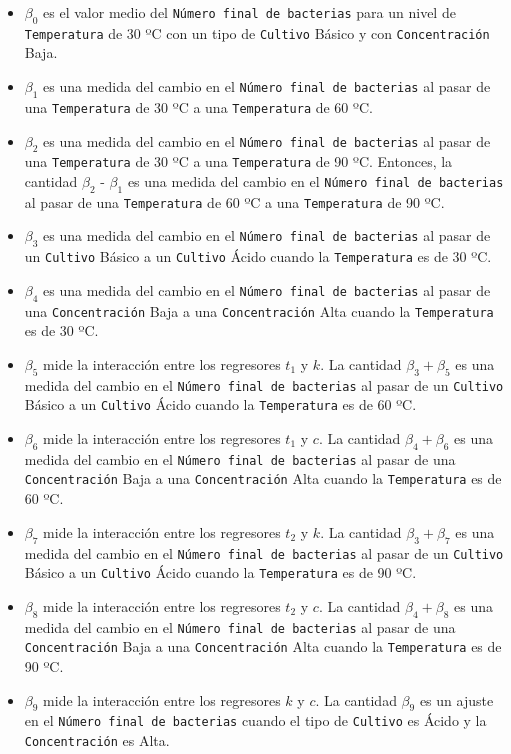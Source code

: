 \documentclass[10pt, spanish]{article}
\begin{document}
\begin{itemize}
\item
  \(\beta_0\) es el valor medio del
  \texttt{Número\ final\ de\ bacterias} para un nivel de
  \texttt{Temperatura} de 30 ºC con un tipo de \texttt{Cultivo} Básico y
  con \texttt{Concentración} Baja.
\item
  \(\beta_1\) es una medida del cambio en el
  \texttt{Número\ final\ de\ bacterias} al pasar de una
  \texttt{Temperatura} de 30 ºC a una \texttt{Temperatura} de 60 ºC.
\item
  \(\beta_2\) es una medida del cambio en el
  \texttt{Número\ final\ de\ bacterias} al pasar de una
  \texttt{Temperatura} de 30 ºC a una \texttt{Temperatura} de 90 ºC.
  Entonces, la cantidad \(\beta_2\) - \(\beta_1\) es una medida del
  cambio en el \texttt{Número\ final\ de\ bacterias} al pasar de una
  \texttt{Temperatura} de 60 ºC a una \texttt{Temperatura} de 90 ºC.
\item
  \(\beta_3\) es una medida del cambio en el
  \texttt{Número\ final\ de\ bacterias} al pasar de un \texttt{Cultivo}
  Básico a un \texttt{Cultivo} Ácido cuando la \texttt{Temperatura} es
  de 30 ºC.
\item
  \(\beta_4\) es una medida del cambio en el
  \texttt{Número\ final\ de\ bacterias} al pasar de una
  \texttt{Concentración} Baja a una \texttt{Concentración} Alta cuando
  la \texttt{Temperatura} es de 30 ºC.
\item
  \(\beta_5\) mide la interacción entre los regresores \(t_1\) y \(k\).
  La cantidad \(\beta_3 + \beta_5\) es una medida del cambio en el
  \texttt{Número\ final\ de\ bacterias} al pasar de un \texttt{Cultivo}
  Básico a un \texttt{Cultivo} Ácido cuando la \texttt{Temperatura} es
  de 60 ºC.
\item
  \(\beta_6\) mide la interacción entre los regresores \(t_1\) y \(c\).
  La cantidad \(\beta_4 + \beta_6\) es una medida del cambio en el
  \texttt{Número\ final\ de\ bacterias} al pasar de una
  \texttt{Concentración} Baja a una \texttt{Concentración} Alta cuando
  la \texttt{Temperatura} es de 60 ºC.
\item
  \(\beta_7\) mide la interacción entre los regresores \(t_2\) y \(k\).
  La cantidad \(\beta_3 + \beta_7\) es una medida del cambio en el
  \texttt{Número\ final\ de\ bacterias} al pasar de un \texttt{Cultivo}
  Básico a un \texttt{Cultivo} Ácido cuando la \texttt{Temperatura} es
  de 90 ºC.
\item
  \(\beta_8\) mide la interacción entre los regresores \(t_2\) y \(c\).
  La cantidad \(\beta_4 + \beta_8\) es una medida del cambio en el
  \texttt{Número\ final\ de\ bacterias} al pasar de una
  \texttt{Concentración} Baja a una \texttt{Concentración} Alta cuando
  la \texttt{Temperatura} es de 90 ºC.
\item
  \(\beta_9\) mide la interacción entre los regresores \(k\) y \(c\). La
  cantidad \(\beta_9\) es un ajuste en el
  \texttt{Número\ final\ de\ bacterias} cuando el tipo de
  \texttt{Cultivo} es Ácido y la \texttt{Concentración} es Alta.
\end{itemize}
\end{document}
